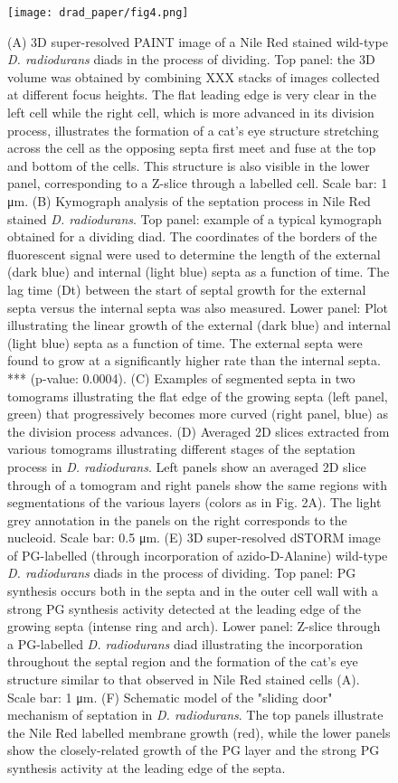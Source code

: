 \begin{figure}
    \centering
    \texttt{[image: drad\_paper/fig4.png]}
    \label{drad_fig4}
\end{figure}
\begin{figure}
    \ContinuedFloat
    \caption[]{(A) 3D super-resolved PAINT image of a Nile Red stained wild-type \textit{D. radiodurans} diads in the process of dividing. Top panel: the 3D volume was obtained by combining XXX stacks of images collected at different focus heights. The flat leading edge is very clear in the left cell while the right cell, which is more advanced in its division process, illustrates the formation of a cat's eye structure stretching across the cell as the opposing septa first meet and fuse at the top and bottom of the cells. This structure is also visible in the lower panel, corresponding to a Z-slice through a labelled cell. Scale bar: 1 μm. (B) Kymograph analysis of the septation process in Nile Red stained \textit{D. radiodurans}. Top panel: example of a typical kymograph obtained for a dividing diad. The coordinates of the borders of the fluorescent signal were used to determine the length of the external (dark blue) and internal (light blue) septa as a function of time. The lag time (Dt) between the start of septal growth for the external septa versus the internal septa was also measured. Lower panel: Plot illustrating the linear growth of the external (dark blue) and internal (light blue) septa as a function of time. The external septa were found to grow at a significantly higher rate than the internal septa. *** (p-value: 0.0004). (C) Examples of segmented septa in two tomograms illustrating the flat edge of the growing septa (left panel, green) that progressively becomes more curved (right panel, blue) as the division process advances. (D) Averaged 2D slices extracted from various tomograms illustrating different stages of the septation process in \textit{D. radiodurans}. Left panels show an averaged 2D slice through of a tomogram and right panels show the same regions with segmentations of the various layers (colors as in Fig. 2A). The light grey annotation in the panels on the right corresponds to the nucleoid. Scale bar: 0.5 μm. (E) 3D super-resolved dSTORM image of PG-labelled (through incorporation of azido-D-Alanine) wild-type \textit{D. radiodurans} diads in the process of dividing. Top panel: PG synthesis occurs both in the septa and in the outer cell wall with a strong PG synthesis activity detected at the leading edge of the growing septa (intense ring and arch). Lower panel: Z-slice through a PG-labelled \textit{D. radiodurans} diad illustrating the incorporation throughout the septal region and the formation of the cat's eye structure similar to that observed in Nile Red stained cells (A). Scale bar: 1 μm. (F) Schematic model of the "sliding door" mechanism of septation in \textit{D. radiodurans}. The top panels illustrate the Nile Red labelled membrane growth (red), while the lower panels show the closely-related growth of the PG layer and the strong PG synthesis activity at the leading edge of the septa.}
\end{figure}

